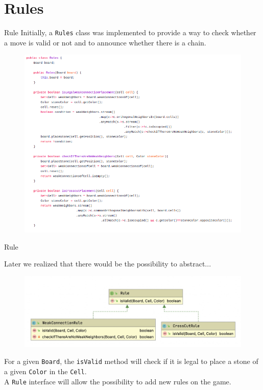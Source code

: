 \documentclass{beamer}
\begin{document}
\section{Rules}

\begin{frame}{Rule}
	Initially, a \texttt{Rules} class was implemented to provide a way to check whether a move is valid or not and to announce whether there is a chain.
	\begin{figure}
		\includegraphics[scale=0.28]{images/rules-class.png}
	\end{figure}
\end{frame}

\begin{frame}{Rule}
	
	Later we realized that there would be the possibility to abstract...
	\begin{figure}
		\includegraphics[scale=0.4]{images/rules-uml.jpg}
	\end{figure}

	For a given \texttt{Board}, the \texttt{isValid} method will check if it is legal to place a stone of a given \texttt{Color} in the \texttt{Cell}. \\
	\vspace{0.1cm}
	A \texttt{Rule} interface will allow the possibility to add new rules on the game.
	
\end{frame}
\end{document}
